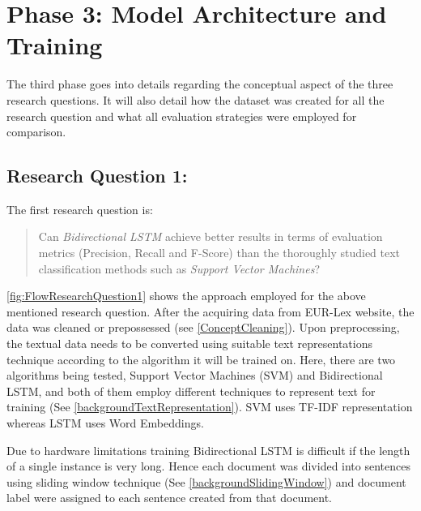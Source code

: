 \section{Phase 3: Model Architecture and Training}
The third phase goes into details regarding the conceptual aspect of the three research questions. It will also detail how the dataset was created for all the research question and what all evaluation strategies were employed for comparison. 

\subsection{Research Question 1:} \label{question1}
The first research question is:
\begin{quote}
    Can \textit{Bidirectional LSTM} achieve better results in terms of evaluation metrics (Precision, Recall and F-Score) than the thoroughly studied text classification methods such as \textit{Support Vector Machines}?
\end{quote}

\ref{fig:FlowResearchQuestion1} shows the approach employed for the above mentioned research question. After the acquiring data from EUR-Lex website, the data was cleaned or prepossessed (see \ref{ConceptCleaning}). Upon preprocessing, the textual data needs to be converted using suitable text representations technique according to the algorithm it will be trained on. Here, there are two algorithms being tested, Support Vector Machines (SVM) and Bidirectional LSTM, and both of them employ different techniques to represent text for training (See \ref{backgroundTextRepresentation}). SVM uses TF-IDF representation whereas LSTM uses Word Embeddings. 
 
Due to hardware limitations training Bidirectional LSTM is difficult if the length of a single instance is very long. Hence each document was divided into sentences using sliding window technique (See \ref{backgroundSlidingWindow}) and document label were assigned to each sentence created from that document. 

